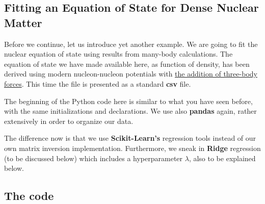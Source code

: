 \documentclass[%
oneside,                 %
final,                   %
10pt]{article}
\begin{document}
\subsection*{Fitting an Equation of State for Dense Nuclear Matter}

Before we continue, let us introduce yet another example. We are going to fit the
nuclear equation of state using results from many-body calculations.
The equation of state we have made available here, as function of
density, has been derived using modern nucleon-nucleon potentials with
\href{{https://www.sciencedirect.com/science/article/pii/S0370157399001106}}{the addition of three-body
forces}. This
time the file is presented as a standard \textbf{csv} file.

The beginning of the Python code here is similar to what you have seen before,
with the same initializations and declarations. We use also \textbf{pandas}
again, rather extensively in order to organize our data.

The difference now is that we use \textbf{Scikit-Learn's} regression tools
instead of our own matrix inversion implementation. Furthermore, we
sneak in \textbf{Ridge} regression (to be discussed below) which includes a
hyperparameter $\lambda$, also to be explained below.

\subsection*{The code}
\end{document}
